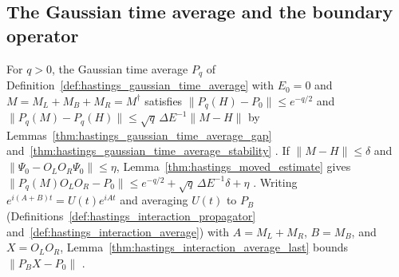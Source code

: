 \subsection*{The Gaussian time average and the boundary operator}

For $q>0$, the Gaussian time average $P_q$ of
Definition~\ref{def:hastings_gaussian_time_average} with $E_0=0$ and
$M=M_L+M_B+M_R=M^\dagger$ satisfies $\|P_q(H)-P_0\|\le e^{-q/2}$ and
$\|P_q(M)-P_q(H)\|\le\sqrt q\,\Delta E^{-1}\|M-H\|$ by
Lemmas~\ref{thm:hastings_gaussian_time_average_gap}
and~\ref{thm:hastings_gaussian_time_average_stability}
\cite[lines 843--864]{Hastings2007AreaLaw}. If $\|M-H\|\le\delta$ and
$\|\Psi_0-O_LO_R\Psi_0\|\le\eta$, Lemma~\ref{thm:hastings_moved_estimate}
gives $\|P_q(M)O_LO_R-P_0\|\le e^{-q/2}+\sqrt q\,\Delta E^{-1}\delta+\eta$
\cite[lines 865--876]{Hastings2007AreaLaw}. Writing
$e^{i(A+B)t}=U(t)e^{iAt}$ and averaging $U(t)$ to $P_B$
(Definitions~\ref{def:hastings_interaction_propagator}
and~\ref{def:hastings_interaction_average}) with $A=M_L+M_R$, $B=M_B$, and
$X=O_LO_R$, Lemma~\ref{thm:hastings_interaction_average_last} bounds
$\|P_BX-P_0\|$ \cite[lines 877--905]{Hastings2007AreaLaw}.

